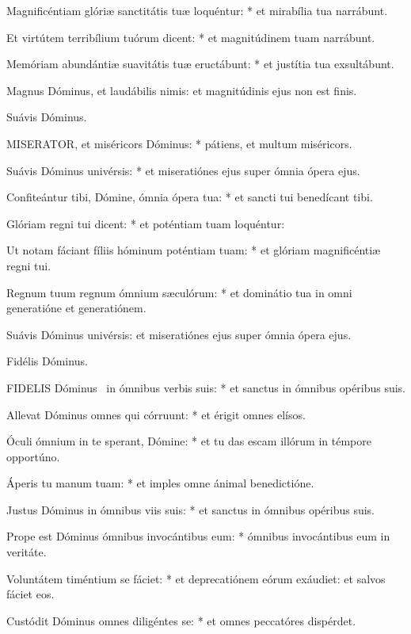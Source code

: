 Magnificéntiam glóriæ sanctitátis tuæ loquéntur: * et mirabília tua narrábunt.

Et virtútem terribílium tuórum dicent: * et magnitúdinem tuam narrábunt.

Memóriam abundántiæ suavitátis tuæ eructábunt: * et justítia tua exsultábunt.

 Magnus Dóminus, et laudábilis nimis: et magnitúdinis ejus non est finis.

 Suávis Dóminus.


\lettrine[lines=2]{M}{ISERATOR}, et miséricors Dóminus: * pátiens, et multum miséricors.

Suávis Dóminus univérsis: * et miseratiónes ejus super ómnia ópera ejus.

Confiteántur tibi, Dómine, ómnia ópera tua: * et sancti tui benedícant tibi.

Glóriam regni tui dicent: * et poténtiam tuam loquéntur:

Ut notam fáciant fíliis hóminum poténtiam tuam: * et glóriam magnificéntiæ regni tui.

Regnum tuum regnum ómnium sæculórum: * et dominátio tua in omni generatióne et generatiónem.

 Suávis Dóminus univérsis: et miseratiónes ejus super ómnia ópera ejus.

 Fidélis Dóminus. \textdagger


\lettrine[lines=2]{F}{IDELIS} Dóminus \textdagger\ in ómnibus verbis suis: * et sanctus in ómnibus opéribus suis.

Allevat Dóminus omnes qui córruunt: * et érigit omnes elísos.

Óculi ómnium in te sperant, Dómine: * et tu das escam illórum in témpore opportúno.

Áperis tu manum tuam: * et imples omne ánimal benedictióne.

Justus Dóminus in ómnibus viis suis: * et sanctus in ómnibus opéribus suis.

Prope est Dóminus ómnibus invocántibus eum: * ómnibus invocántibus eum in veritáte.

Voluntátem timéntium se fáciet: * et deprecatiónem eórum exáudiet: et salvos fáciet eos.

Custódit Dóminus omnes diligéntes se: * et omnes peccatóres dispérdet.


